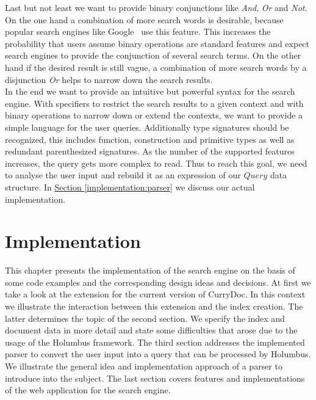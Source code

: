 \documentclass[%
	pdftex,%
	a4paper,%
	oneside,%
	chapterprefix,%
	headsepline,%
	12pt%
]{scrbook}
\newcommand{\Conid}[1]{\mathit{#1}}
\begin{document}
Last but not least we want to provide binary conjunctions like \emph{And},
\emph{Or} and \emph{Not}. On the one hand a combination of more search
words is desirable, because popular search engines like
Google\texttrademark~ use this feature. This increases the probability
that users assume binary operations are standard features and expect
search engines to provide the conjunction of several search terms. On
the other hand if the desired result is still vague, a combination of
more search words by a disjunction \emph{Or} helps to narrow down the
search results.\\

In the end we want to provide an intuitive but powerful syntax for the
search engine. With specifiers to restrict the search results to a
given context and with binary operations to narrow down or extend the
contexts, we want to provide a simple language for the user
queries. Additionally type signatures should be recognized, this
includes function, construction and primitive types as well as
redundant parenthesized signatures. As the number of the supported
features increases, the query gets more complex to read. Thus to reach
this goal, we need to analyse the user input and rebuild it as an
expression of our \ensuremath{\Conid{Query}} data structure. In
\hyperref[implementation:parser]{Section \ref{implementation:parser}}
we discuss our actual implementation.

\chapter{Implementation}\label{implementation}

This chapter presents the implementation of the search engine on the
basis of some code examples and the corresponding design ideas and
decisions. At first we take a look at the extension for the current
version of CurryDoc. In this context we illustrate the interaction
between this extension and the index creation. The latter determines
the topic of the second section. We specify the index and document
data in more detail and state some difficulties that arose due to the
usage of the Holumbus framework. The third section addresses the
implemented parser to convert the user input into a query that can be
processed by Holumbus. We illustrate the general idea and
implementation approach of a parser to introduce into the subject. The
last section covers features and implementations of the web
application for the search engine.
\end{document}
